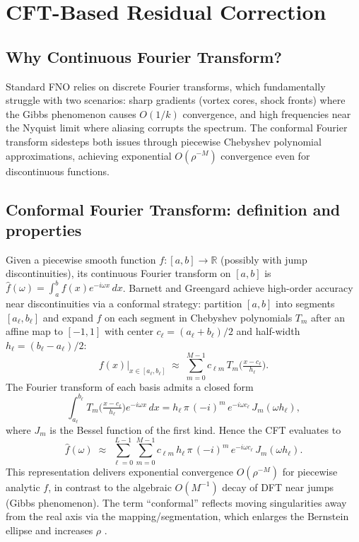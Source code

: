 \documentclass[11pt]{article}
\newcommand{\R}{\mathbb{R}}
\begin{document}
\section{CFT-Based Residual Correction}

\subsection{Why Continuous Fourier Transform?}

Standard FNO relies on discrete Fourier transforms, which fundamentally struggle with two scenarios: sharp gradients (vortex cores, shock fronts) where the Gibbs phenomenon causes $O(1/k)$ convergence, and high frequencies near the Nyquist limit where aliasing corrupts the spectrum. The conformal Fourier transform \citep{barnett2010conformal} sidesteps both issues through piecewise Chebyshev polynomial approximations, achieving exponential $O(\rho^{-M})$ convergence even for discontinuous functions.

\subsection{Conformal Fourier Transform: definition and properties}

Given a piecewise smooth function $f:[a,b]\to\R$ (possibly with jump discontinuities), its continuous Fourier transform on $[a,b]$ is $\hat f(\omega)=\int_a^b f(x) e^{-i\omega x}\,dx$. Barnett and Greengard \citep{barnett2010conformal} achieve high-order accuracy near discontinuities via a conformal strategy: partition $[a,b]$ into segments $[a_\ell,b_\ell]$ and expand $f$ on each segment in Chebyshev polynomials $T_m$ after an affine map to $[-1,1]$ with center $c_\ell=(a_\ell+b_\ell)/2$ and half-width $h_\ell=(b_\ell-a_\ell)/2$:
\begin{equation}
f(x)\big|_{x\in[a_\ell,b_\ell]} \;\approx\; \sum_{m=0}^{M-1} c_{\ell m} \, T_m\!\Big( \tfrac{x-c_\ell}{h_\ell} \Big).
\end{equation}
The Fourier transform of each basis admits a closed form
\begin{equation}
\int_{a_\ell}^{b_\ell} T_m\!\Big( \tfrac{x-c_\ell}{h_\ell} \Big) e^{-i\omega x}\,dx 
= h_\ell \, \pi \, (-i)^m \, e^{-i\omega c_\ell} \, J_m(\omega h_\ell),
\label{eq:cheb-bessel}
\end{equation}
where $J_m$ is the Bessel function of the first kind. Hence the CFT evaluates to
\begin{equation}
\hat f(\omega) \;\approx\; \sum_{\ell=0}^{L-1} \sum_{m=0}^{M-1} c_{\ell m} \, h_\ell \, \pi \, (-i)^m \, e^{-i\omega c_\ell} \, J_m(\omega h_\ell).
\label{eq:cft-sum}
\end{equation}
This representation delivers exponential convergence $O(\rho^{-M})$ for piecewise analytic $f$, in contrast to the algebraic $O(M^{-1})$ decay of DFT near jumps (Gibbs phenomenon). The term “conformal” reflects moving singularities away from the real axis via the mapping/segmentation, which enlarges the Bernstein ellipse and increases $\rho$ \citep{trefethen2019approximation,barnett2010conformal}.
\end{document}
